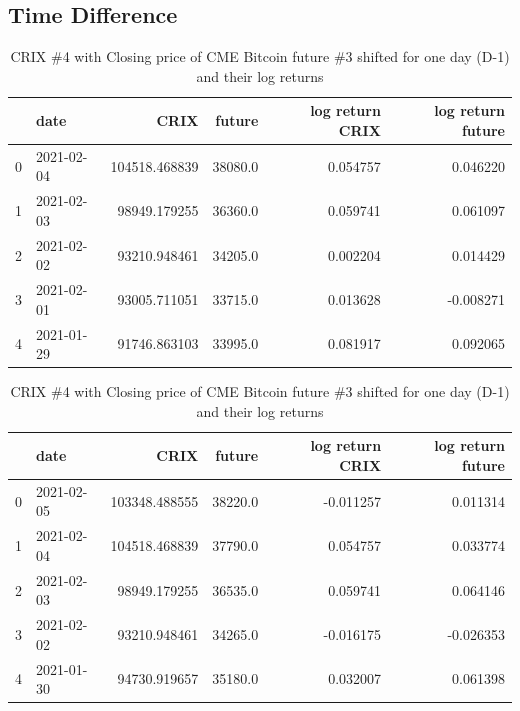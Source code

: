 \subsection{Time Difference}\label{subsec:time-difference}
\begin{table}[h]
    \centering
    \begin{tabular}[width=\textwidth]{llrrrr}
\toprule
 &                      date &           CRIX &   future &  log return CRIX &  log return future \\
\midrule
0 & 2021-02-04  &  104518.468839 &  38080.0 &         0.054757 &           0.046220 \\
1 & 2021-02-03  &   98949.179255 &  36360.0 &         0.059741 &           0.061097 \\
2 & 2021-02-02  &   93210.948461 &  34205.0 &         0.002204 &           0.014429 \\
3 & 2021-02-01  &   93005.711051 &  33715.0 &         0.013628 &          -0.008271 \\
4 & 2021-01-29  &   91746.863103 &  33995.0 &         0.081917 &           0.092065 \\
\bottomrule
    \end{tabular}
    \caption{CRIX \#4 with Opening price of CME Bitcoin future \#2 and their log returns}
    \label{tab:table2} \medskip

\begin{tabular}[width=\textwidth]{llrrrr}
\toprule
{} &                      date &           CRIX &   future &  log return CRIX &  log return future \\
\midrule
0 & 2021-02-05  &  103348.488555 &  38220.0 &        -0.011257 &           0.011314 \\
1 & 2021-02-04  &  104518.468839 &  37790.0 &         0.054757 &           0.033774 \\
2 & 2021-02-03  &   98949.179255 &  36535.0 &         0.059741 &           0.064146 \\
3 & 2021-02-02  &   93210.948461 &  34265.0 &        -0.016175 &          -0.026353 \\
4 & 2021-01-30  &   94730.919657 &  35180.0 &         0.032007 &           0.061398 \\
\bottomrule
\end{tabular}
    \caption{CRIX \#4 with Closing price of CME Bitcoin future \#3 shifted for one day (D-1) and their log returns}
    \label{tab:table3}
\end{table}

